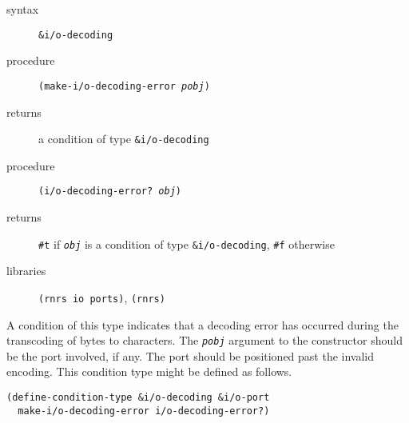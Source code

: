 \begin{description}

\label{exceptions_s42}\item[syntax] \texttt{\&{}i/o-decoding}



\item[procedure] \texttt{(make-i/o-decoding-error \textit{pobj})}



\item[returns] a condition of type \texttt{\&{}i/o-decoding}


\item[procedure] \texttt{(i/o-decoding-error? \textit{obj})}



\item[returns] \texttt{\#{}t} if \texttt{\textit{obj}} is a condition of type \texttt{\&{}i/o-decoding}, \texttt{\#{}f} otherwise


\item[libraries] \texttt{(rnrs io ports)}, \texttt{(rnrs)}
\end{description}



A condition of this type indicates that a decoding error has occurred
during the transcoding of bytes to characters.
The \texttt{\textit{pobj}} argument to the constructor should be the
port involved, if any.
The port should be positioned past the invalid encoding.
This condition type might be defined as follows.

\begin{alltt}
(define-condition-type \&{}i/o-decoding \&{}i/o-port
  make-i/o-decoding-error i/o-decoding-error?)
\end{alltt}

